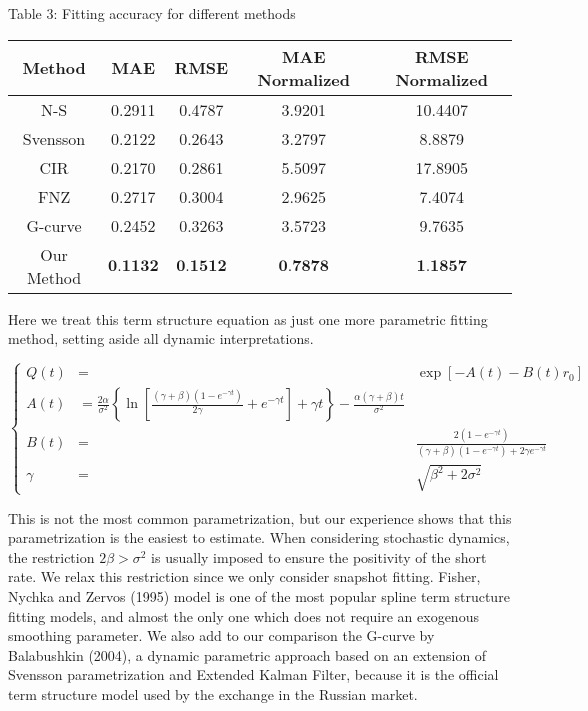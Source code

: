 \documentclass[10pt]{article}
\begin{document}
Table 3: Fitting accuracy for different methods

\begin{center}
\begin{tabular}{|c|cccc|}
\hline
Method & MAE & RMSE & MAE Normalized & RMSE Normalized \\
\hline
N-S & 0.2911 & 0.4787 & 3.9201 & 10.4407 \\
Svensson & 0.2122 & 0.2643 & 3.2797 & 8.8879 \\
CIR & 0.2170 & 0.2861 & 5.5097 & 17.8905 \\
FNZ & 0.2717 & 0.3004 & 2.9625 & 7.4074 \\
G-curve & 0.2452 & 0.3263 & 3.5723 & 9.7635 \\
Our Method & $\mathbf{0 . 1 1 3 2}$ & $\mathbf{0 . 1 5 1 2}$ & $\mathbf{0 . 7 8 7 8}$ & $\mathbf{1 . 1 8 5 7}$ \\
\hline
\end{tabular}
\end{center}

Here we treat this term structure equation as just one more parametric fitting method, setting aside all dynamic interpretations.

$$
\left\{\begin{array}{ccc}
Q(t) & = & \exp \left[-A(t)-B(t) r_{0}\right] \\
A(t) & =\frac{2 \alpha}{\sigma^{2}}\left\{\ln \left[\frac{(\gamma+\beta)\left(1-e^{-\gamma t}\right)}{2 \gamma}+e^{-\gamma t}\right]+\gamma t\right\}-\frac{\alpha(\gamma+\beta) t}{\sigma^{2}} \\
B(t) & = & \frac{2\left(1-e^{-\gamma t}\right)}{(\gamma+\beta)\left(1-e^{-\gamma t}\right)+2 \gamma e^{-\gamma t}} \\
\gamma & = & \sqrt{\beta^{2}+2 \sigma^{2}}
\end{array}\right.
$$

This is not the most common parametrization, but our experience shows that this parametrization is the easiest to estimate. When considering stochastic dynamics, the restriction $2 \beta>\sigma^{2}$ is usually imposed to ensure the positivity of the short rate. We relax this restriction since we only consider snapshot fitting. Fisher, Nychka and Zervos (1995) model is one of the most popular spline term structure fitting models, and almost the only one which does not require an exogenous smoothing parameter. We also add to our comparison the G-curve by Balabushkin (2004), a dynamic parametric approach based on an extension of Svensson parametrization and Extended Kalman Filter, because it is the official term structure model used by the exchange in the Russian market.
\end{document}
